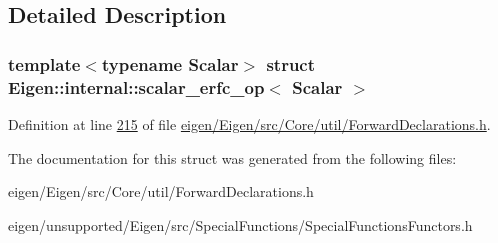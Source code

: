 \subsection{Detailed Description}
\subsubsection*{template$<$typename Scalar$>$\newline
struct Eigen\+::internal\+::scalar\+\_\+erfc\+\_\+op$<$ Scalar $>$}



Definition at line \hyperlink{eigen_2_eigen_2src_2_core_2util_2_forward_declarations_8h_source_l00215}{215} of file \hyperlink{eigen_2_eigen_2src_2_core_2util_2_forward_declarations_8h_source}{eigen/\+Eigen/src/\+Core/util/\+Forward\+Declarations.\+h}.



The documentation for this struct was generated from the following files\+:\begin{DoxyCompactItemize}
\item 
eigen/\+Eigen/src/\+Core/util/\+Forward\+Declarations.\+h\item 
eigen/unsupported/\+Eigen/src/\+Special\+Functions/\+Special\+Functions\+Functors.\+h\end{DoxyCompactItemize}

